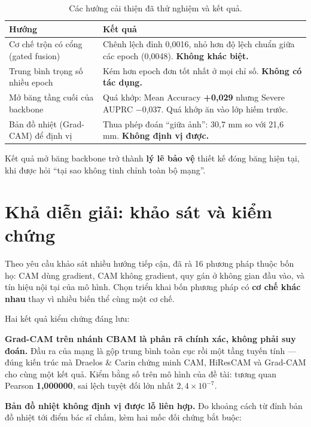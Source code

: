 \documentclass[11pt,a4paper]{article}
\newcommand{\up}[1]{\textcolor{teal!70!black}{\textbf{#1}}}
\newcommand{\down}[1]{\textcolor{red!65!black}{#1}}
\begin{document}
\begin{table}[htbp]
\centering\small
\caption{Các hướng cải thiện đã thử nghiệm và kết quả.}
\label{tab:neg}
\begin{tabular}{p{4.6cm}p{9.8cm}}
\toprule
\textbf{Hướng} & \textbf{Kết quả} \\
\midrule
Cơ chế trộn có cổng (gated fusion) &
Chênh lệch đỉnh 0{,}0016, nhỏ hơn độ lệch chuẩn giữa các epoch (0{,}0048). \textbf{Không khác biệt.} \\
Trung bình trọng số nhiều epoch &
Kém hơn epoch đơn tốt nhất ở mọi chỉ số. \textbf{Không có tác dụng.} \\
Mở băng tầng cuối của backbone &
Quá khớp: Mean Accuracy \up{+0{,}029} nhưng Severe AUPRC \down{$-$0{,}037}. Quá khớp ăn vào lớp hiếm trước. \\
Bản đồ nhiệt (Grad-CAM) để định vị &
Thua phép đoán ``giữa ảnh'': 30{,}7 mm so với 21{,}6 mm. \textbf{Không định vị được.} \\
\bottomrule
\end{tabular}
\end{table}

Kết quả mở băng backbone trở thành \textbf{lý lẽ bảo vệ} thiết kế đóng băng hiện tại, khi được hỏi
``tại sao không tinh chỉnh toàn bộ mạng''.

\section{Khả diễn giải: khảo sát và kiểm chứng}

Theo yêu cầu khảo sát nhiều hướng tiếp cận, đã rà 16 phương pháp thuộc bốn họ: CAM dùng gradient,
CAM không gradient, quy gán ở không gian đầu vào, và tín hiệu nội tại của mô hình. Chọn triển khai
bốn phương pháp có \textbf{cơ chế khác nhau} thay vì nhiều biến thể cùng một cơ chế.

Hai kết quả kiểm chứng đáng lưu:

\textbf{Grad-CAM trên nhánh CBAM là phân rã chính xác, không phải suy đoán.} Đầu ra của mạng là
gộp trung bình toàn cục rồi một tầng tuyến tính --- đúng kiến trúc mà Draelos \& Carin chứng minh
CAM, HiResCAM và Grad-CAM cho cùng một kết quả. Kiểm bằng số trên mô hình của đề tài: tương quan
Pearson \textbf{1{,}000000}, sai lệch tuyệt đối lớn nhất $2{,}4\times10^{-7}$.

\textbf{Bản đồ nhiệt không định vị được lỗ liên hợp.} Đo khoảng cách từ đỉnh bản đồ nhiệt tới điểm
bác sĩ chấm, kèm hai mốc đối chứng bắt buộc:
\end{document}
